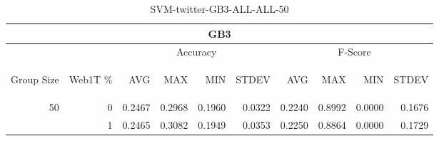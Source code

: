 \begin{center}
\begin{table}[htbp] 
 \begin{center}
\begin{tabular}{ | r | r | r | r | r | r | r | r | r | r |}
\hline
\multicolumn{10}{|c|}{GB3}\\
\hline
 & & \multicolumn{4}{|c|}{Accuracy} & \multicolumn{4}{|c|}{F-Score}\\ \cline{3-10}
\begin{sideways}Group Size\end{sideways} & \begin{sideways}Web1T \%\end{sideways} & \begin{sideways}AVG\end{sideways} & \begin{sideways}MAX\end{sideways} & \begin{sideways}MIN\end{sideways} & \begin{sideways}STDEV\end{sideways} & \begin{sideways}AVG\end{sideways} & \begin{sideways}MAX\end{sideways} & \begin{sideways}MIN\end{sideways} & \begin{sideways}STDEV\end{sideways}\\
\hline
\multirow{1}{*}{50}
 & 0 & 0.2467 & 0.2968 & 0.1960 & 0.0322 & 0.2240 & 0.8992 & 0.0000 & 0.1676\\ \cline{2-10}
 & 1 & 0.2465 & 0.3082 & 0.1949 & 0.0353 & 0.2250 & 0.8864 & 0.0000 & 0.1729\\ \cline{2-10}
\hline
\end{tabular}
\caption{SVM-twitter-GB3-ALL-ALL-50}
\label{table:SVM-twitter-GB3-ALL-ALL-50}
\end{center}
 \end{table}
\end{center}


